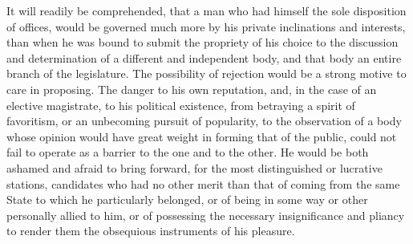 It will readily be comprehended, that a man who had himself the sole disposition of offices, would be governed much more by his private inclinations and interests, than when he was bound to submit the propriety of his choice to the discussion and determination of a different and independent body, and that body an entire branch of the legislature. The possibility of rejection would be a strong motive to care in proposing. The danger to his own reputation, and, in the case of an elective magistrate, to his political existence, from betraying a spirit of favoritism, or an unbecoming pursuit of popularity, to the observation of a body whose opinion would have great weight in forming that of the public, could not fail to operate as a barrier to the one and to the other. He would be both ashamed and afraid to bring forward, for the most distinguished or lucrative stations, candidates who had no other merit than that of coming from the same State to which he particularly belonged, or of being in some way or other personally allied to him, or of possessing the necessary insignificance and pliancy to render them the obsequious instruments of his pleasure.

